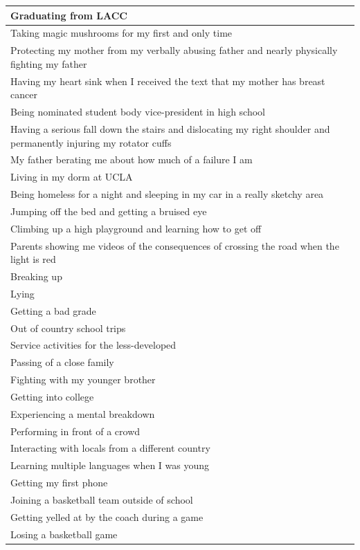 \documentclass[
  .7em,
  letterpaper,
  DIV=11,
  numbers=noendperiod]{scrartcl}
\begin{document}
\begin{table}
\begin{tabular}{l}
\hline
Graduating from LACC\\
\hline
Taking magic mushrooms for my first and only time\\
\hline
Protecting my mother from my verbally abusing father and nearly physically fighting my father\\
\hline
Having my heart sink when I received the text that my mother has breast cancer\\
\hline
Being nominated student body vice-president in high school\\
\hline
Having a serious fall down the stairs and dislocating my right shoulder and permanently injuring my rotator cuffs\\
\hline
My father berating me about how much of a failure I am\\
\hline
Living in my dorm at UCLA\\
\hline
Being homeless for a night and sleeping in my car in a really sketchy area\\
\hline
Jumping off the bed and getting a bruised eye\\
\hline
Climbing up a high playground and learning how to get off\\
\hline
Parents showing me videos of the consequences of crossing the road when the light is red\\
\hline
Breaking up\\
\hline
Lying\\
\hline
Getting a bad grade\\
\hline
Out of country school trips\\
\hline
Service activities for the less-developed\\
\hline
Passing of a close family\\
\hline
Fighting with my younger brother\\
\hline
Getting into college\\
\hline
Experiencing a mental breakdown\\
\hline
Performing in front of a crowd\\
\hline
Interacting with locals from a different country\\
\hline
Learning multiple languages when I was young\\
\hline
Getting my first phone\\
\hline
Joining a basketball team outside of school\\
\hline
Getting yelled at by the coach during a game\\
\hline
Losing a basketball game\\

\end{tabular}
\end{table}
\end{document}
